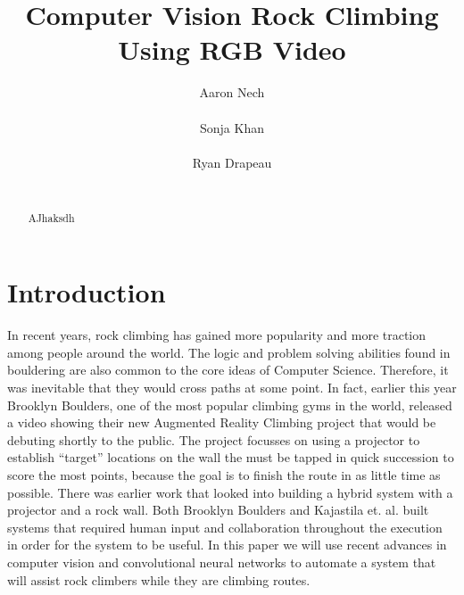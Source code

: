 \documentclass{chi2009}
\begin{document}
\setlength{\paperheight}{11in}
\setlength{\paperwidth}{8.5in}
\setlength{\pdfpageheight}{\paperheight}
\setlength{\pdfpagewidth}{\paperwidth}


\title{Computer Vision Rock Climbing Using RGB Video}
\author{
  \alignauthor Aaron Nech\\
    \\
  \alignauthor Sonja Khan\\
    \\
  \alignauthor Ryan Drapeau\\
    \\
}

\maketitle

\begin{abstract}
AJhaksdh
\end{abstract}


\section{Introduction}
In recent years, rock climbing has gained more popularity and more traction among people around the world. The logic and problem solving abilities found in bouldering are also common to the core ideas of Computer Science. Therefore, it was inevitable that they would cross paths at some point. In fact, earlier this year Brooklyn Boulders, one of the most popular climbing gyms in the world, released a video showing their new Augmented Reality Climbing project that would be debuting shortly to the public. The project focusses on using a projector to establish ``target'' locations on the wall the must be tapped in quick succession to score the most points, because the goal is to finish the route in as little time as possible. There was earlier work that looked into building a hybrid system with a projector and a rock wall. Both Brooklyn Boulders and Kajastila et. al. built systems that required human input and collaboration throughout the execution in order for the system to be useful. In this paper we will use recent advances in computer vision and convolutional neural networks to automate a system that will assist rock climbers while they are climbing routes.
\end{document}
